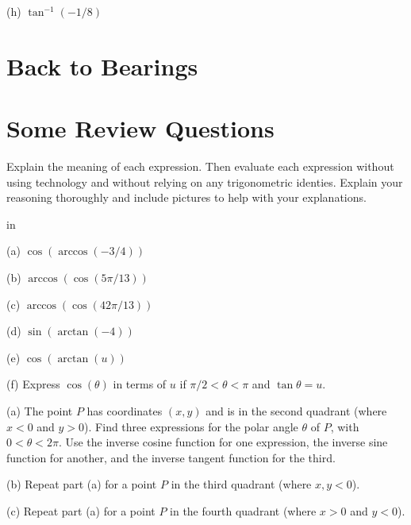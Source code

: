 \documentclass{ximera}
\newcommand{\pskip}{\vskip 0.1 in}
\begin{document}
\begin{question}
(h) $\tan^{-1}(-1/8)$

\begin{exploration}\label{Exp3:Comp}

 
\begin{onlineOnly}
    \begin{center}
\end{center}
\end{onlineOnly}
\end{exploration}

\end{question}


\section{Back to Bearings}




\section{Some Review Questions}

\begin{question}   \label{Q17:InverseTrig}
Explain the meaning of each expression. Then evaluate each expression without using technology and without relying on any trigonometric identies. Explain your reasoning thoroughly and include pictures to help with your explanations.

\pskip

(a) $\cos (\arccos(-3/4))$ 

(b) $\arccos(\cos (5\pi/13))$

(c) $\arccos(\cos (42\pi/13))$

(d) $\sin(\arctan (-4))$

(e) $\cos(\arctan (u))$

(f) Express $\cos (\theta)$ in terms of $u$  if $\pi/2 < \theta < \pi$ and $\tan \theta=u$.

\end{question} 


\begin{question} \label{Q18:InverseTrig}
(a) The point $P$ has coordinates $(x,y)$ and is in the second quadrant (where $x<0$ and $y>0$). Find three expressions for the polar angle $\theta$ of $P$, with $0 < \theta < 2\pi$. Use the inverse cosine function for one expression, the inverse sine function for another, and the inverse tangent function for the third. 

(b) Repeat part (a) for a point $P$ in the third quadrant (where $x,y<0$).

(c) Repeat part (a) for a point $P$ in the fourth quadrant (where $x>0$ and $y<0$).
\end{question}
\end{document}
